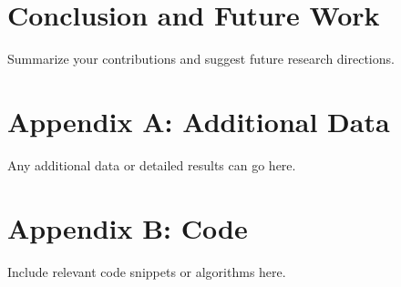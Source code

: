 \documentclass[12pt]{report}
\begin{document}
\chapter{Conclusion and Future Work}
Summarize your contributions and suggest future research directions.

\printbibliography

\appendix
\chapter{Appendix A: Additional Data}
Any additional data or detailed results can go here.

\chapter{Appendix B: Code}
Include relevant code snippets or algorithms here.
\end{document}
